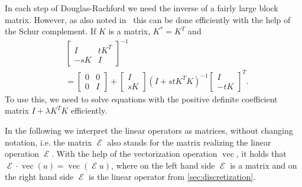 \documentclass[twocolumn,envcountsame]{svjour3}
\DeclareMathOperator{\symgrad}{\mathcal{E}}
\begin{document}
In each step of Douglas-Rachford we need the inverse of a fairly large block matrix. However, as
also noted in~\cite{oconnor2014primal} this can be done efficiently with the help of the Schur
complement. If $K$ is a matrix, $K^*=K^T$ and
\begin{align*}
  &\left[\begin{array}{cc}I&tK^T\\-sK&I\end{array}\right]^{-1}\\
    &=\left[\begin{array}{cc}0&0\\0&I\end{array}\right]+\left[\begin{array}{c}I\\sK\end{array}\right](I+stK^TK)^{-1}\left[\begin{array}{c}I\\-tK\end{array}\right]^T.
\end{align*}
To use this, we need to solve
equations with the positive definite coefficient matrix $I+\lambda K^TK$ efficiently. 

In the following we interpret the linear operators as matrices, without changing notation, i.e. 
the matrix $\symgrad$ also stands for the matrix realizing the linear operation $\symgrad$. With the help of the vectorization operation
   $\operatorname{vec}$, it holds that $\symgrad \cdot \operatorname{vec}(u)=\operatorname{vec}(\symgrad u)$, where
   on the left hand side $\symgrad$ is a matrix and on the right hand side $\symgrad$ is the linear operator from
   \ref{sec:discretization}.
\end{document}
